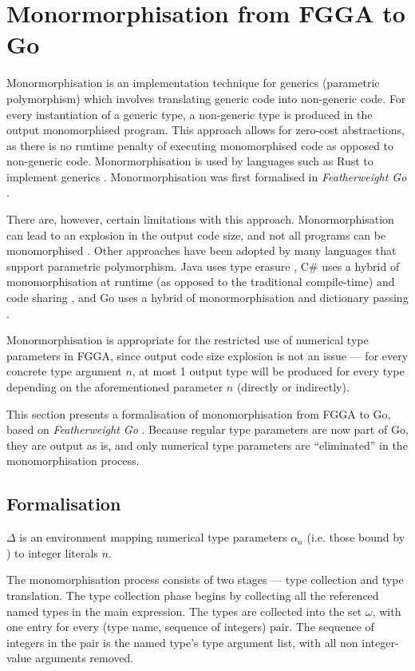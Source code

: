 \section{Monormorphisation from FGGA to Go}
\label{ch:monomo}

Monormorphisation is an implementation technique for generics (parametric
polymorphism) which involves translating generic code into non-generic code. For
every instantiation of a generic type, a non-generic type is produced in the
output monomorphised program. This approach allows for zero-cost abstractions,
as there is no runtime penalty of executing monomorphised code as opposed to
non-generic code. Monormorphisation is used by languages such as Rust to
implement generics \autocite{rustCompilerGuide}. Monormorphisation was first
formalised in \emph{Featherweight Go} \autocite{fg}.

There are, however, certain limitations with this approach. Monormorphisation
can lead to an explosion in the output code size, and not all programs can be
monomorphised \autocite{fg}. Other approaches have been adopted by many
languages that support parametric polymorphism. Java uses type erasure
\autocite{javaSpec}, C\# uses a hybrid of monomorphisation at runtime (as
opposed to the traditional compile-time) and code sharing
\autocite{clrGenerics}, and Go uses a hybrid of monormorphisation and dictionary
passing \autocite{generics1.18}.

Monormorphisation is appropriate for the restricted use of numerical type
parameters in FGGA, since output code size explosion is not an issue --- for
every concrete type argument $n$, at most 1 output type will be produced for
every type depending on the aforementioned parameter $n$ (directly or
indirectly).

This section presents a formalisation of monomorphisation from FGGA to Go, based
on \emph{Featherweight Go} \autocite{fg}. Because regular type parameters are
now part of Go, they are output as is, and only numerical type parameters are
``eliminated'' in the monomorphisation process.

\subsection{Formalisation}

$\Delta$ is an environment mapping numerical type parameters $\alpha_n$ (i.e.
those bound by ) to integer literals $n$.

The monomorphisation process consists of two stages --- type collection and type
translation. The type collection phase begins by collecting all the referenced
named types in the main expression. The types are collected into the set
$\omega$, with one entry for every (type name, sequence of integers) pair. The
sequence of integers in the pair is the named type's type argument list, with
all non integer-value arguments removed.

